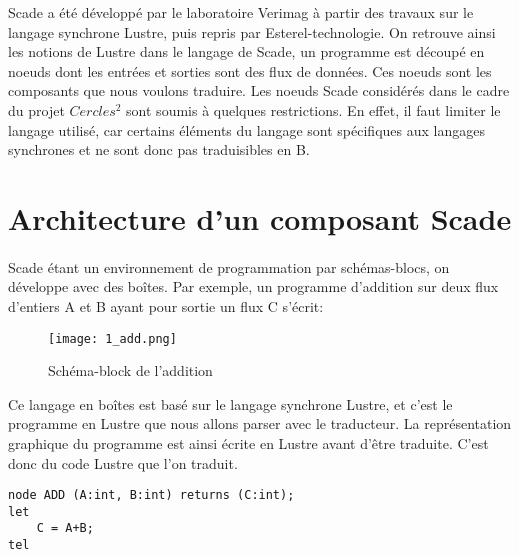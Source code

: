 


Scade a été développé par le laboratoire Verimag à partir des travaux sur
le langage synchrone Lustre, puis repris par Esterel-technologie. On retrouve
ainsi les notions de Lustre dans le langage de Scade, un programme est découpé
en noeuds dont les entrées et sorties sont des flux de données. Ces
noeuds sont les composants que nous voulons traduire. 
Les noeuds Scade considérés dans le cadre du projet $Cercles^2$ sont
soumis à quelques restrictions. En effet, il faut limiter le langage
utilisé, car certains éléments du langage sont spécifiques aux
langages synchrones et ne sont donc pas traduisibles en B.\\


\section{Architecture d'un composant Scade}

\paragraph{}
Scade étant un environnement de programmation par schémas-blocs, on
développe avec des boîtes. Par exemple, un programme d'addition sur deux flux d'entiers A
et B ayant pour sortie un flux C s'écrit:

\begin{figure}[h]
\begin{center}
\texttt{[image: 1\_add.png]}
\end{center}
\caption{Schéma-block de l'addition}
\end{figure}

Ce langage en boîtes est basé sur le langage synchrone Lustre, et
c'est le programme en Lustre que nous allons parser avec le
traducteur. La représentation graphique du programme est ainsi
écrite en Lustre avant d'être traduite. C'est donc du code Lustre
que l'on traduit.

\begin{verbatim}
node ADD (A:int, B:int) returns (C:int);
let 
    C = A+B;
tel
\end{verbatim}


